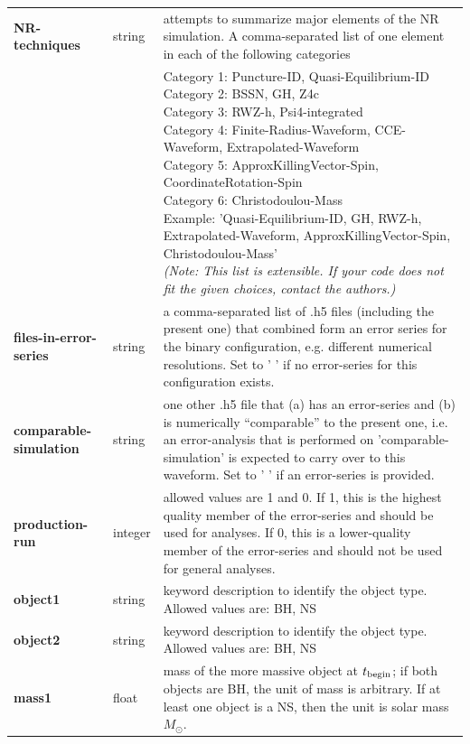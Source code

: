 \documentclass[11pt,tightenlines,article,amssymb,amsmath,amsfonts,superscriptaddress,nofootinbib]{revtex4}
\begin{document}
\begin{longtable}{|p{3.4cm}|p{1.6cm}|p{11.2cm}|}
\textbf{NR-techniques} & string & attempts to summarize major elements of the NR simulation. A comma-separated list of one element in each of the following categories \\
  & & \parbox{11.2cm}{
Category 1: Puncture-ID, Quasi-Equilibrium-ID \\
Category 2: BSSN, GH, Z4c \\
Category 3: RWZ-h,  Psi4-integrated \\
Category 4: Finite-Radius-Waveform, CCE-Waveform, Extrapolated-Waveform \\
Category 5: ApproxKillingVector-Spin, CoordinateRotation-Spin \\
Category 6: Christodoulou-Mass \\
Example: 'Quasi-Equilibrium-ID, GH, RWZ-h, Extrapolated-Waveform, ApproxKillingVector-Spin, Christodoulou-Mass'\\
\emph{(Note: This list is extensible. If your code does not fit the given choices, contact the authors.)}
}\\
\textbf{files-in-error-series} & string &  a comma-separated list of .h5 files (including the present one) that combined form an error series for the binary configuration, e.g. different numerical resolutions. Set to ' ' if no error-series for this configuration exists.\\

\textbf{\footnotesize comparable-simulation} & string & one other .h5 file that (a) has an error-series and (b) is numerically ``comparable'' to the present one, i.e. an error-analysis that is performed on 'comparable-simulation' is expected to carry over to this waveform. Set to ' ' if an error-series is provided.\\

\textbf{production-run} & integer & allowed values are 1 and 0. If 1, this is the highest quality member of the error-series and should be used for analyses.  If 0, this is a lower-quality member of the error-series and should not be used for general analyses.\\

\textbf{object1} & string & keyword description to identify the object type. Allowed values are: BH, NS\\

\textbf{object2} & string & keyword description to identify the object type. Allowed values are: BH, NS\\

\textbf{mass1} & float & mass of the more massive object at $t_{\rm begin}$; if both objects are BH, the unit of mass is arbitrary. If at least one object is a NS, then the unit is solar mass $M_\odot$.\\


\end{longtable}
\end{document}
